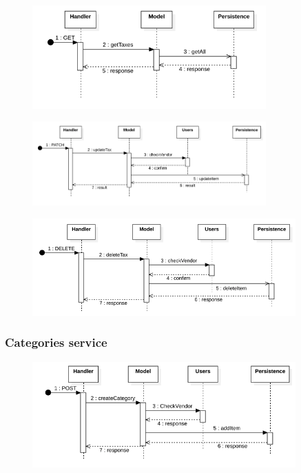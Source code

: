 \begin{figure}[H]
    \includegraphics[width=0.8\textwidth]{res/images/sequence-diagrams/taxes/getTaxes.png}
\end{figure}

\begin{figure}[H]
    \includegraphics[width=0.8\textwidth]{res/images/sequence-diagrams/taxes/updateTax.png}
\end{figure}

\begin{figure}[H]
    \includegraphics[width=0.9\textwidth]{res/images/sequence-diagrams/taxes/deleteTax.png}
\end{figure}

\subsubsection{Categories service}
\begin{figure}[H]
    \includegraphics[width=0.9\textwidth]{res/images/sequence-diagrams/categories/createCategory.png}
\end{figure}

